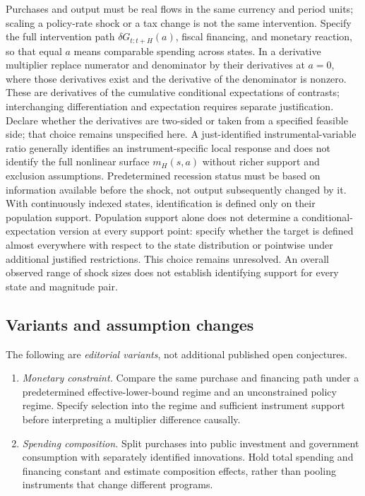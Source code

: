 \documentclass[11pt,a4paper]{article}
\begin{document}
Purchases and output must be real flows in the same currency and period units; scaling a policy-rate shock or a tax change is not the same intervention. Specify the full intervention path \(\delta G_{t:t+H}(a)\), fiscal financing, and monetary reaction, so that equal \(a\) means comparable spending across states. In a derivative multiplier replace numerator and denominator by their derivatives at \(a=0\), where those derivatives exist and the derivative of the denominator is nonzero. These are derivatives of the cumulative conditional expectations of contrasts; interchanging differentiation and expectation requires separate justification. Declare whether the derivatives are two-sided or taken from a specified feasible side; that choice remains unspecified here. A just-identified instrumental-variable ratio generally identifies an instrument-specific local response and does not identify the full nonlinear surface \(m_H(s,a)\) without richer support and exclusion assumptions. Predetermined recession status must be based on information available before the shock, not output subsequently changed by it. With continuously indexed states, identification is defined only on their population support. Population support alone does not determine a conditional-expectation version at every support point: specify whether the target is defined almost everywhere with respect to the state distribution or pointwise under additional justified restrictions. This choice remains unresolved. An overall observed range of shock sizes does not establish identifying support for every state and magnitude pair.
\subsection*{Variants and assumption changes}
The following are \emph{editorial variants}, not additional published open conjectures.
\begin{enumerate}
\item \emph{Monetary constraint.} Compare the same purchase and financing path under a predetermined effective-lower-bound regime and an unconstrained policy regime. Specify selection into the regime and sufficient instrument support before interpreting a multiplier difference causally.
\item \emph{Spending composition.} Split purchases into public investment and government consumption with separately identified innovations. Hold total spending and financing constant and estimate composition effects, rather than pooling instruments that change different programs.
\end{enumerate}
\end{document}
